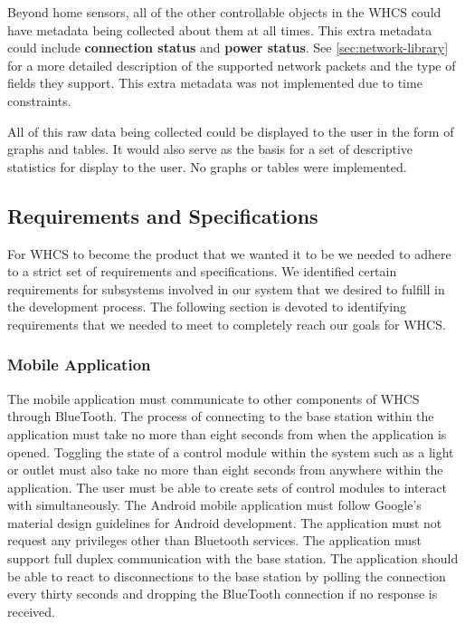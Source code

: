 
Beyond home sensors, all of the other controllable objects in the WHCS
could have metadata being collected about them at all times. This extra metadata
could include \textbf{connection status} and \textbf{power status}. See
\autoref{sec:network-library} for a more detailed description of the supported
network packets and the type of fields they support. This extra metadata was not
implemented due to time constraints.

All of this raw data being collected could be displayed to the user in the form
of graphs and tables. It would also serve as the basis for a set of descriptive
statistics for display to the user. No graphs or tables were implemented.

\subsection{Requirements and Specifications}
For WHCS to become the product that we wanted it to be we needed to adhere to a strict
set of requirements and specifications.  We identified certain
requirements for subsystems involved in our system that we desired to fulfill in the
development process. The following section is devoted to identifying
requirements that we needed to meet to completely reach our goals for WHCS.

\subsubsection{Mobile Application}

The mobile application must communicate to other components of WHCS through
BlueTooth. The process of connecting to the base station within the application
must take no more than eight seconds from when the application is opened.
Toggling the state of a control module within the system such as a light or
outlet must also take no more than eight seconds from anywhere within the
application. The user must be able to create sets of control modules to
interact with simultaneously. The Android mobile application must follow
Google{}'s material design guidelines for Android development. The application
must not request any privileges other than Bluetooth services. The application
must support full duplex communication with the base station. The application
should be able to react to disconnections to the base station by polling the
connection every thirty seconds and dropping the BlueTooth connection if no
response is received.

